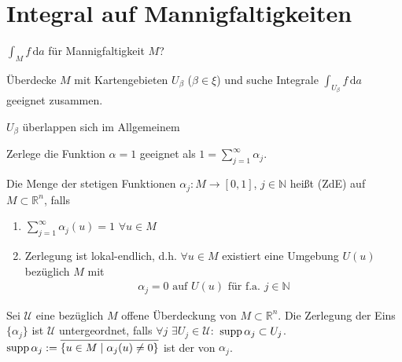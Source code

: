 \section{Integral auf Mannigfaltigkeiten}

\begin{underlinedenvironment}[Frage]
	$\displaystyle \int_M f\,\mathrm{d}a$ für Mannigfaltigkeit $M$?
\end{underlinedenvironment}

\begin{underlinedenvironment}[Idee]
	Überdecke $M$ mit Kartengebieten $U_{\beta}$ ($\beta \in \xi$) und suche Integrale $\int_{U_\beta}f\,\mathrm{d}a$ geeignet zusammen.
\end{underlinedenvironment}

\begin{underlinedenvironment}[Problem]
	$U_\beta$ überlappen sich im Allgemeinem
\end{underlinedenvironment}

\begin{underlinedenvironment}[Ausweg]
	Zerlege die Funktion $\alpha=1$ geeignet als $1 = \sum_{j=1}^\infty \alpha_j$.
\end{underlinedenvironment}

\begin{*definition}
	Die Menge der stetigen Funktionen $\alpha_j\colon M\to[0,1]$, $j\in\mathbb{N}$ heißt  (ZdE) auf $M\subset\mathbb{R}^n$, falls \begin{enumerate}[label={\roman*)}]
		\item $\displaystyle \sum_{j=1}^\infty \alpha_j(u) = 1$ $\forall u\in M$
		\item Zerlegung ist lokal-endlich, d.h. $\forall u\in M$ existiert eine Umgebung $U(u)$ bezüglich $M$ mit \begin{align*}
			\alpha_j = 0\text{ auf }U(u)\text{ für f.a. }j\in\mathbb{N}
		\end{align*}
	\end{enumerate}
\end{*definition}
\begin{*definition}
	Sei $\mathcal{U}$ eine bezüglich $M$ offene Überdeckung von $M\subset\mathbb{R}^n$. Die Zerlegung der Eins $\{\alpha_j \}$ ist $\mathcal{U}$ untergeordnet, falls $\forall j$ $\exists U_j\in \mathcal{U}\colon$ $\operatorname{supp} \alpha_j\subset U_j$. $\supp \alpha_j := \overline{\{ u\in M \mid \alpha_j(u)\neq 0\}}$ ist der  von $\alpha_j$.
\end{*definition}

